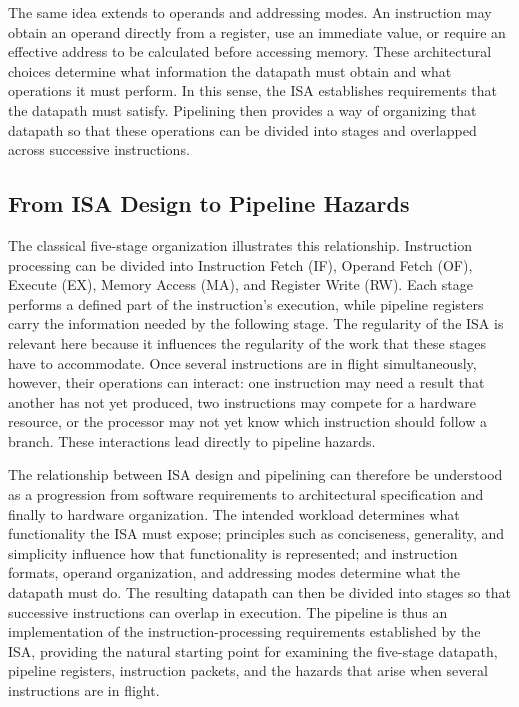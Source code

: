 \documentclass[11pt,a4paper]{report}
\begin{document}
The same idea extends to operands and addressing modes. An instruction may obtain an operand directly from a register, use an immediate value, or require an effective address to be calculated before accessing memory. These architectural choices determine what information the datapath must obtain and what operations it must perform. In this sense, the ISA establishes requirements that the datapath must satisfy. Pipelining then provides a way of organizing that datapath so that these operations can be divided into stages and overlapped across successive instructions.~\cite{sarangi}

\subsection{From ISA Design to Pipeline Hazards}

The classical five-stage organization illustrates this relationship. Instruction processing can be divided into Instruction Fetch (IF), Operand Fetch (OF), Execute (EX), Memory Access (MA), and Register Write (RW). Each stage performs a defined part of the instruction's execution, while pipeline registers carry the information needed by the following stage. The regularity of the ISA is relevant here because it influences the regularity of the work that these stages have to accommodate. Once several instructions are in flight simultaneously, however, their operations can interact: one instruction may need a result that another has not yet produced, two instructions may compete for a hardware resource, or the processor may not yet know which instruction should follow a branch. These interactions lead directly to pipeline hazards.

The relationship between ISA design and pipelining can therefore be understood as a progression from software requirements to architectural specification and finally to hardware organization. The intended workload determines what functionality the ISA must expose; principles such as conciseness, generality, and simplicity influence how that functionality is represented; and instruction formats, operand organization, and addressing modes determine what the datapath must do. The resulting datapath can then be divided into stages so that successive instructions can overlap in execution. The pipeline is thus an implementation of the instruction-processing requirements established by the ISA, providing the natural starting point for examining the five-stage datapath, pipeline registers, instruction packets, and the hazards that arise when several instructions are in flight.~\cite{sarangi} ~\cite{hennessy}
\end{document}
